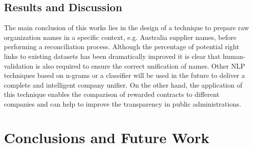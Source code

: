 \documentclass{llncs}
\begin{document}
\subsection{Results and Discussion}
The main conclusion of this works lies in the design of a technique to prepare 
raw organization names in a specific context, e.g. Australia supplier names,  
before performing a reconciliation process. Although the percentage of potential 
right links to existing datasets has been dramatically improved it is clear that 
human-validation is also required to ensure the correct unification of names. 
Other NLP techniques based on n-grams or a classifier will be used in the future 
to deliver a complete and intelligent company unifier. On the other hand, the 
application of this technique enables the comparison of rewarded contracts to 
different companies and can help to improve the transparency in public 
administrations.

\section{Conclusions and Future Work}

% 
\end{document}
